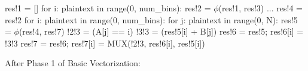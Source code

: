 \documentclass[sigconf, screen, natbib=false, dvipsnames, table]{acmart}
\theoremstyle{definition}
\begin{document}
\begin{algorithmic}

\STATE res!1 = []
\STATE for i: plaintext in range(0, num\_bins):
\STATE \hspace{0.25cm} res!2 = $\phi$(res!1, res!3)
\STATE  \hspace{0.25cm} ...
\STATE res!4 = res!2 
\STATE for i: plaintext in range(0, num\_bins):
\STATE \hspace{0.25cm}        for j: plaintext in range(0, N):
\STATE \hspace{0.5cm}            res!5 = $\phi$(res!4, res!7)
\STATE \hspace{0.5cm}            !2!3 = (A[j] == i)
\STATE \hspace{0.5cm}            !3!3 = (res!5[i] + B[j])
\STATE \hspace{0.5cm}            res!6 = res!5; res!6[i] = !3!3
\STATE \hspace{0.5cm}            res!7 = res!6; res!7[i] = MUX(!2!3, res!6[i], res!5[i])

\end{algorithmic}

After Phase 1 of Basic Vectorization:
\end{document}
